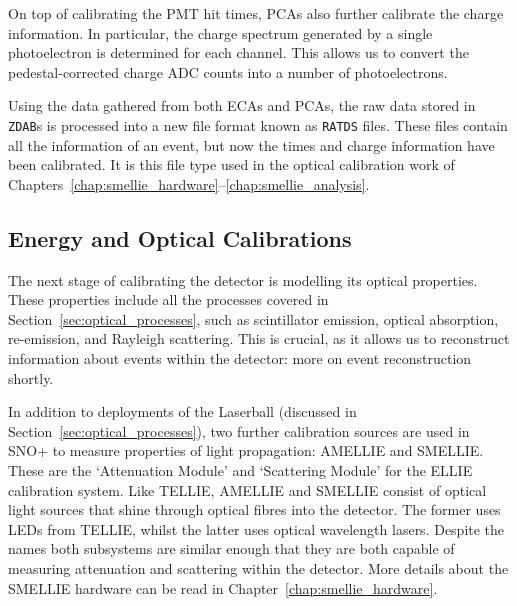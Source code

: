 On top of calibrating the PMT hit times, PCAs also further calibrate the charge information. In particular, the charge spectrum generated by a single photoelectron is determined for each channel. This allows us to convert the pedestal-corrected charge ADC counts into a number of photoelectrons.

Using the data gathered from both ECAs and PCAs, the raw data stored in \texttt{ZDAB}s is processed into a new file format known as \texttt{RATDS} files. These files contain all the information of an event, but now the times and charge information have been calibrated. It is this file type used in the optical calibration work of Chapters~\ref{chap:smellie_hardware}--\ref{chap:smellie_analysis}.

\subsection{Energy and Optical Calibrations}\label{sec:eo_calibs}
The next stage of calibrating the detector is modelling its optical properties. These properties include all the processes covered in Section~\ref{sec:optical_processes}, such as scintillator emission, optical absorption, re-emission, and Rayleigh scattering.
This is crucial, as it allows us to reconstruct information about events within the detector: more on event reconstruction shortly.

In addition to deployments of the Laserball (discussed in Section~\ref{sec:optical_processes}), two further calibration sources are used in SNO+ to measure properties of light propagation: AMELLIE and SMELLIE. These are the `Attenuation Module' and `Scattering Module' for the ELLIE calibration system. Like TELLIE, AMELLIE and SMELLIE consist of optical light sources that shine through optical fibres into the detector. The former uses LEDs from TELLIE, whilst the latter uses optical wavelength lasers. Despite the names both subsystems are similar enough that they are both capable of measuring attenuation and scattering within the detector. More details about the SMELLIE hardware can be read in Chapter~\ref{chap:smellie_hardware}.

